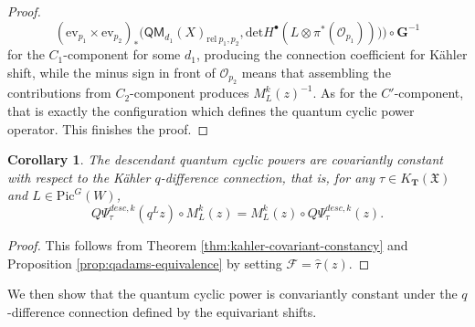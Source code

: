 \documentclass[reqno]{amsart}
\numberwithin{equation}{section}
\numberwithin{equation}{section}
\numberwithin{equation}{section}
\newtheorem{cor}[thm]{Corollary}
\theoremstyle{definition}
\theoremstyle{remark}
\theoremstyle{remark}
\begin{document}
\begin{proof}
    \begin{equation}
        (\mathrm{ev}_{p_1} \times \mathrm{ev}_{p_2})_* \big( \mathsf{QM}_{d_1}(X)_{\mathrm{rel} \ p_1, p_2}, \mathrm{det} H^{\bullet}(L \otimes \pi^*(\mathcal{O}_{p_1})) \big) \big)\circ \mathbf{G}^{-1}
    \end{equation}
    for the $C_1$-component for some $d_1$, producing the connection coefficient for K\"ahler shift, while the minus sign in front of $\mathcal{O}_{p_2}$ means that assembling the contributions from $C_2$-component produces $M_L^k(z)^{-1}$. As for the $C'$-component, that is exactly the configuration which defines the quantum cyclic power operator. This finishes the proof.
\end{proof}

\begin{cor}
    The descendant quantum cyclic powers are covariantly constant with respect to the K\"ahler $q$-difference connection, that is, for any $\tau \in K_{\mathbf{T}}(\mathfrak{X})$ and $L \in \mathrm{Pic}^G(W)$,
    \begin{equation}
        Q\Psi_\tau^{desc, k}(q^L z) \circ M_L^k(z) = M^k_L(z) \circ Q\Psi_\tau^{desc, k}(z).
    \end{equation}
\end{cor}
\begin{proof}
    This follows from Theorem \ref{thm:kahler-covariant-constancy} and Proposition \ref{prop:qadams-equivalence} by setting $\mathcal{F} = \hat{\tau}(z)$.
\end{proof}

We then show that the quantum cyclic power is convariantly constant under the $q$-difference connection defined by the equivariant shifts.
\end{document}
